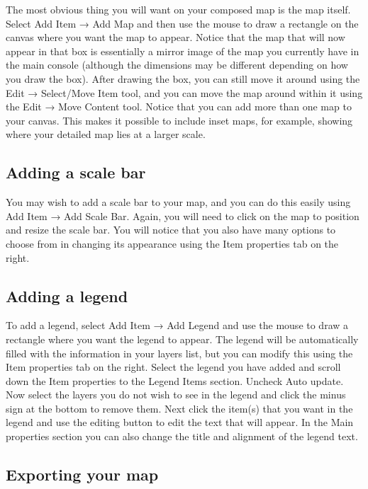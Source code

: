 \documentclass[]{book}
\begin{document}
The most obvious thing you will want on your composed map is the map itself. Select Add Item → Add Map and then use the mouse to draw a rectangle on the canvas where you want the map to appear. Notice that the map that will now appear in that box is essentially a mirror image of the map you currently have in the main console (although the dimensions may be different depending on how you draw the box). After drawing the box, you can still move it around using the Edit → Select/Move Item tool, and you can move the map around within it using the Edit → Move Content tool. Notice that you can add more than one map to your canvas. This makes it possible to include inset maps, for example, showing where your detailed map lies at a larger scale.

\hypertarget{adding-a-scale-bar}{%
\subsection{Adding a scale bar}\label{adding-a-scale-bar}}

You may wish to add a scale bar to your map, and you can do this easily using Add Item → Add Scale Bar. Again, you will need to click on the map to position and resize the scale bar. You will notice that you also have many options to choose from in changing its appearance using the Item properties tab on the right.

\hypertarget{adding-a-legend}{%
\subsection{Adding a legend}\label{adding-a-legend}}

To add a legend, select Add Item → Add Legend and use the mouse to draw a rectangle where you want the legend to appear. The legend will be automatically filled with the information in your layers list, but you can modify this using the Item properties tab on the right. Select the legend you have added and scroll down the Item properties to the Legend Items section. Uncheck Auto update. Now select the layers you do not wish to see in the legend and click the minus sign at the bottom to remove them. Next click the item(s) that you want in the legend and use the editing button to edit the text that will appear. In the Main properties section you can also change the title and alignment of the legend text.

\hypertarget{exporting-your-map}{%
\subsection{Exporting your map}\label{exporting-your-map}}
\end{document}
